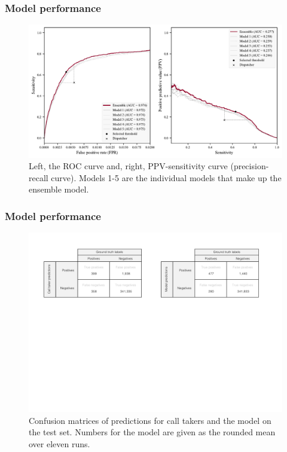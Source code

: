 \begin{frame}
    \frametitle{Model performance}
    \begin{figure}
        \centering
        \includegraphics[width=0.65\paperwidth]{../graphics/paper_retrospective/figure1.pdf}
        \caption{Left, the ROC curve and, right, PPV-sensitivity curve (precision-recall curve). Models 1-5 are the individual models that make up the ensemble model.}
    \end{figure}
\end{frame}


\begin{frame}
    \frametitle{Model performance}
    \begin{figure}
        \centering
        \caption{Confusion matrices of predictions for call takers and the model on the test set. Numbers for the model are given as the rounded mean over eleven runs.}
        \includegraphics[width=0.85\paperwidth]{../graphics/paper_retrospective/figure2.pdf}
    \end{figure}
\end{frame}


